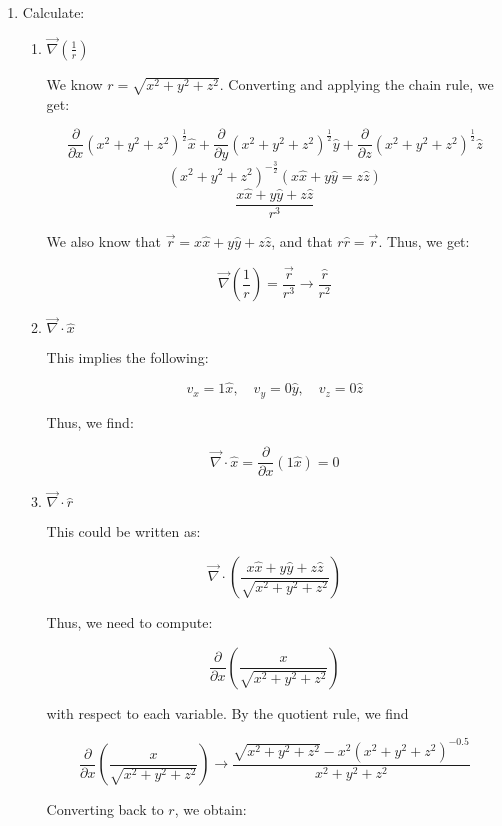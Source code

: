 \begin{enumerate}
    
  \item Calculate:

    \begin{enumerate}

      \item $\vec{\nabla}\left( \frac{1}{r} \right)$

        We know $r=\sqrt{x^2+y^2+z^2}$. Converting and applying the chain rule, we get:

        $$\frac{\partial}{\partial x}\left( x^2+y^2+z^2\right)^{\frac{1}{2}}\hat{x}+\frac{\partial}{\partial y}\left( x^2+y^2+z^2\right)^{\frac{1}{2}}\hat{y}+\frac{\partial}{\partial z}\left( x^2+y^2+z^2\right)^{\frac{1}{2}}\hat{z}$$
        $$(x^2+y^2+z^2)^{-\frac{3}{2}}(x\hat{x}+y\hat{y}=z\hat{z})$$
        $$\frac{x\hat{x}+y\hat{y}+z\hat{z}}{r^3}$$

        We also know that $\vec{r}=x\hat{x}+y\hat{y}+z\hat{z}$, and that $r\hat{r}=\vec{r}$. Thus, we get:

        $$\boxed{\vec{\nabla}\left( \frac{1}{r} \right)=\frac{\vec{r}}{r^3}\rightarrow\frac{\hat{r}}{r^2}}$$

      \item $\vec{\nabla}\cdot\hat{x}$

        This implies the following:

        $$v_x=1\hat{x},\quad v_y=0\hat{y},\quad v_z=0\hat{z}$$

        Thus, we find:

        $$\boxed{\vec{\nabla}\cdot\hat{x}=\frac{\partial}{\partial x}(1\hat{x})=0}$$

      \item $\vec{\nabla}\cdot\hat{r}$

        This could be written as:

        $$\vec{\nabla}\cdot\left( \frac{x\hat{x}+y\hat{y}+z\hat{z}}{\sqrt{x^2+y^2+z^2}} \right)$$

        Thus, we need to compute:

        $$\frac{\partial}{\partial x}\left(\frac{x}{\sqrt{x^2+y^2+z^2}}\right)$$

        with respect to each variable. By the quotient rule, we find

        $$\frac{\partial}{\partial x}\left(\frac{x}{\sqrt{x^2+y^2+z^2}}\right)\rightarrow \frac{\sqrt{x^2+y^2+z^2}-x^2(x^2+y^2+z^2)^{-0.5}}{x^2+y^2+z^2}$$

        Converting back to $r$, we obtain:


\end{enumerate}
\end{enumerate}
